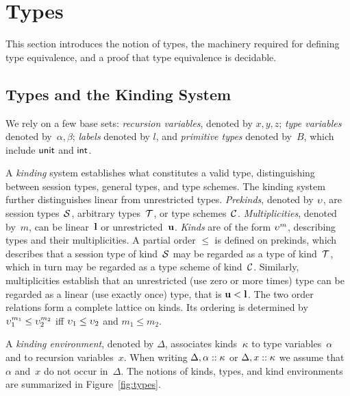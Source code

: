 \section{Types}
\label{sec:types}

This section introduces the notion of types, the machinery required
for defining type equivalence, and a proof that type equivalence is
decidable. %

\subsection{Types and the Kinding System}
\label{sec:types-kinding-system}


We rely on a few base sets: \emph{recursion variables}, denoted by
$x,y,z$; \emph{type variables} denoted by~$\alpha,\beta$;
\emph{labels} denoted by $l$,
and \emph{primitive types} denoted by~$B$, which include $\mathsf{unit}$ and
$\mathsf{int}$.


A \emph{kinding} system establishes what constitutes a valid type,
distinguishing between session types, general types, and type schemes.
%
The kinding system further distinguishes linear from unrestricted
types.
%
\emph{Prekinds}, denoted by $\upsilon$, are session types~$\mathcal S$,
arbitrary types~$\mathcal T$, or type schemes~$\mathcal C$. \emph{Multiplicities}, denoted by~$m$, can be
linear~$\mathbf{l}$ or unrestricted~$\mathbf{u}$. \emph{Kinds} are of
the form $\upsilon^m$, describing types and their multiplicities.
%
A partial order $\le$ is defined on prekinds, which describes that a session
type of kind~$\mathcal S$ may be regarded as a type of kind~$\mathcal T$,
which in turn may be regarded as a type scheme of kind~$\mathcal C$.
Similarly, multiplicities establish that an unrestricted (use zero or more times)
type can be regarded as  a linear (use exactly once) type,
that is $\mathbf{u} < \mathbf{l}$. The two order relations form a
complete lattice on kinds. Its ordering is determined by
$\upsilon_1^{m_1} \le \upsilon_2^{m_2}$ iff
$\upsilon_1 \le \upsilon_2$ and $m_1 \le m_2$.




A \emph{kinding environment}, denoted by $\Delta$, associates
kinds~$\kappa$ to type variables~$\alpha$ and to recursion
variables~$x$. When writing $\Delta, \alpha::\kappa$ or
$\Delta,x::\kappa$ we assume that~$\alpha$ and~$x$ do not occur
in~$\Delta$.
%
The notions of kinds, types, and kind environments are summarized in
Figure~\ref{fig:types}.

